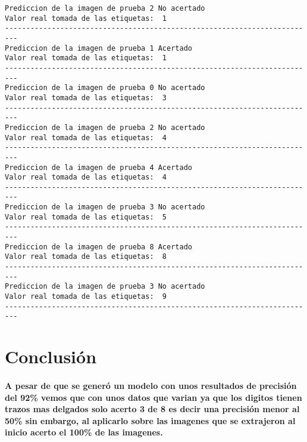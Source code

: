 \documentclass[11pt]{article}
\begin{document}
    \begin{Verbatim}[commandchars=\\\{\}]
Prediccion de la imagen de prueba 2 No acertado
Valor real tomada de las etiquetas:  1
-------------------------------------------------------------------------
Prediccion de la imagen de prueba 1 Acertado
Valor real tomada de las etiquetas:  1
-------------------------------------------------------------------------
Prediccion de la imagen de prueba 0 No acertado
Valor real tomada de las etiquetas:  3
-------------------------------------------------------------------------
Prediccion de la imagen de prueba 2 No acertado
Valor real tomada de las etiquetas:  4
-------------------------------------------------------------------------
Prediccion de la imagen de prueba 4 Acertado
Valor real tomada de las etiquetas:  4
-------------------------------------------------------------------------
Prediccion de la imagen de prueba 3 No acertado
Valor real tomada de las etiquetas:  5
-------------------------------------------------------------------------
Prediccion de la imagen de prueba 8 Acertado
Valor real tomada de las etiquetas:  8
-------------------------------------------------------------------------
Prediccion de la imagen de prueba 3 No acertado
Valor real tomada de las etiquetas:  9
-------------------------------------------------------------------------
    \end{Verbatim}

    \section{Conclusión}\label{conclusiuxf3n}

    \paragraph{A pesar de que se generó un modelo con unos resultados de
precisión del 92\% vemos que con unos datos que varian ya que los
digitos tienen trazos mas delgados solo acerto 3 de 8 es decir una
precisión menor al 50\% sin embargo, al aplicarlo sobre las imagenes que
se extrajeron al inicio acerto el 100\% de las
imagenes.}\label{a-pesar-de-que-se-generuxf3-un-modelo-con-unos-resultados-de-precisiuxf3n-del-92-vemos-que-con-unos-datos-que-varian-ya-que-los-digitos-tienen-trazos-mas-delgados-solo-acerto-3-de-8-es-decir-una-precisiuxf3n-menor-al-50-sin-embargo-al-aplicarlo-sobre-las-imagenes-que-se-extrajeron-al-inicio-acerto-el-100-de-las-imagenes.}
\end{document}
